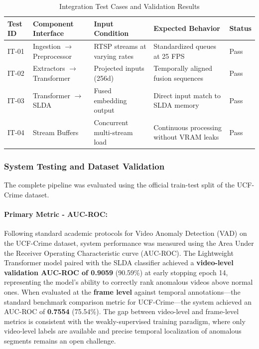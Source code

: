 \documentclass[12pt]{article}
\begin{document}
\begin{table}[H]
    \centering
    \caption{Integration Test Cases and Validation Results}
    \label{tab:integration_testing}
    \small
    \begin{tabular}{lp{3.5cm}p{4cm}p{4cm}l}
        \toprule
        \textbf{Test ID} & \textbf{Component Interface} & \textbf{Input Condition} & \textbf{Expected Behavior} & \textbf{Status} \\
        \midrule
        IT-01 & Ingestion $\to$ Preprocessor & RTSP streams at varying rates & Standardized queues at 25 FPS & Pass \\
        IT-02 & Extractors $\to$ Transformer & Projected inputs (256d) & Temporally aligned fusion sequences & Pass \\
        IT-03 & Transformer $\to$ SLDA & Fused embedding output & Direct input match to SLDA memory & Pass \\
        IT-04 & Stream Buffers & Concurrent multi-stream load & Continuous processing without VRAM leaks & Pass \\
        \bottomrule
    \end{tabular}
\end{table}

\subsubsection{System Testing and Dataset Validation}
The complete pipeline was evaluated using the official train-test split of the UCF-Crime dataset. 

\paragraph{Primary Metric - AUC-ROC:}
Following standard academic protocols for Video Anomaly Detection (VAD) on the UCF-Crime dataset, system performance was measured using the Area Under the Receiver Operating Characteristic curve (AUC-ROC). The Lightweight Transformer model paired with the SLDA classifier achieved a \textbf{video-level validation AUC-ROC of 0.9059} (90.59\%) at early stopping epoch 14, representing the model's ability to correctly rank anomalous videos above normal ones. When evaluated at the \textbf{frame level} against temporal annotations---the standard benchmark comparison metric for UCF-Crime---the system achieved an AUC-ROC of \textbf{0.7554} (75.54\%). The gap between video-level and frame-level metrics is consistent with the weakly-supervised training paradigm, where only video-level labels are available and precise temporal localization of anomalous segments remains an open challenge.
\end{document}
